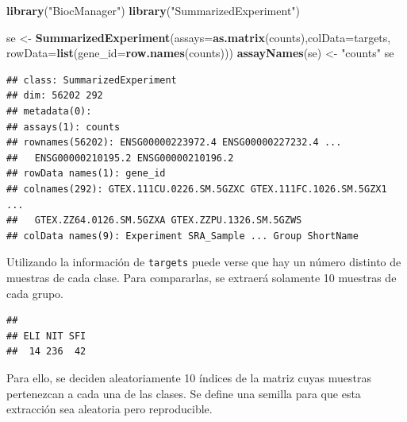 \documentclass[
]{article}
\newenvironment{Shaded}{\begin{snugshade}}{\end{snugshade}}
\newcommand{\DataTypeTok}[1]{\textcolor[rgb]{0.13,0.29,0.53}{#1}}
\newcommand{\KeywordTok}[1]{\textcolor[rgb]{0.13,0.29,0.53}{\textbf{#1}}}
\newcommand{\NormalTok}[1]{#1}
\newcommand{\OperatorTok}[1]{\textcolor[rgb]{0.81,0.36,0.00}{\textbf{#1}}}
\newcommand{\StringTok}[1]{\textcolor[rgb]{0.31,0.60,0.02}{#1}}
\begin{document}
\begin{Shaded}
\begin{Highlighting}[]
\KeywordTok{library}\NormalTok{(}\StringTok{"BiocManager"}\NormalTok{)}
\KeywordTok{library}\NormalTok{(}\StringTok{"SummarizedExperiment"}\NormalTok{)}
\end{Highlighting}
\end{Shaded}

\begin{Shaded}
\begin{Highlighting}[]
\NormalTok{se <-}\StringTok{ }\KeywordTok{SummarizedExperiment}\NormalTok{(}\DataTypeTok{assays=}\KeywordTok{as.matrix}\NormalTok{(counts),}\DataTypeTok{colData=}\NormalTok{targets,}
                           \DataTypeTok{rowData=}\KeywordTok{list}\NormalTok{(}\DataTypeTok{gene_id=}\KeywordTok{row.names}\NormalTok{(counts)))}
\KeywordTok{assayNames}\NormalTok{(se) <-}\StringTok{ "counts"}
\NormalTok{se}
\end{Highlighting}
\end{Shaded}

\begin{verbatim}
## class: SummarizedExperiment 
## dim: 56202 292 
## metadata(0):
## assays(1): counts
## rownames(56202): ENSG00000223972.4 ENSG00000227232.4 ...
##   ENSG00000210195.2 ENSG00000210196.2
## rowData names(1): gene_id
## colnames(292): GTEX.111CU.0226.SM.5GZXC GTEX.111FC.1026.SM.5GZX1 ...
##   GTEX.ZZ64.0126.SM.5GZXA GTEX.ZZPU.1326.SM.5GZWS
## colData names(9): Experiment SRA_Sample ... Group ShortName
\end{verbatim}

Utilizando la información de \texttt{targets} puede verse que hay un
número distinto de muestras de cada clase. Para compararlas, se extraerá
solamente 10 muestras de cada grupo.

\begin{Shaded}
\end{Shaded}

\begin{verbatim}
## 
## ELI NIT SFI 
##  14 236  42
\end{verbatim}

Para ello, se deciden aleatoriamente 10 índices de la matriz cuyas
muestras pertenezcan a cada una de las clases. Se define una semilla
para que esta extracción sea aleatoria pero reproducible.
\end{document}
